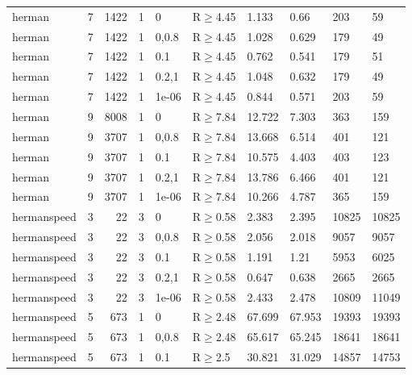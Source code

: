\begin{longtable}{llrrllllll}
 herman        & 7        &   	1422 &   1 & 0     & R$\geq$4.45  & 1.133   & 0.66    & 203     & 59     \\
 herman        & 7        &   	1422 &   1 & 0,0.8 & R$\geq$4.45  & 1.028   & 0.629   & 179     & 49     \\
 herman        & 7        &   	1422 &   1 & 0.1   & R$\geq$4.45  & 0.762   & 0.541   & 179     & 51     \\
 herman        & 7        &   	1422 &   1 & 0.2,1 & R$\geq$4.45  & 1.048   & 0.632   & 179     & 49     \\
 herman        & 7        &   	1422 &   1 & 1e-06 & R$\geq$4.45  & 0.844   & 0.571   & 203     & 59     \\
 herman        & 9        &   	8008 &   1 & 0     & R$\geq$7.84  & 12.722  & 7.303   & 363     & 159    \\
 herman        & 9        &   	3707 &   1 & 0,0.8 & R$\geq$7.84  & 13.668  & 6.514   & 401     & 121    \\
 herman        & 9        &   	3707 &   1 & 0.1   & R$\geq$7.84  & 10.575  & 4.403   & 403     & 123    \\
 herman        & 9        &   	3707 &   1 & 0.2,1 & R$\geq$7.84  & 13.786  & 6.466   & 401     & 121    \\
 herman        & 9        &   	3707 &   1 & 1e-06 & R$\geq$7.84  & 10.266  & 4.787   & 365     & 159    \\
 hermanspeed   & 3        &     	22 &   3 & 0     & R$\geq$0.58  & 2.383   & 2.395   & 10825   & 10825  \\
 hermanspeed   & 3        &     	22 &   3 & 0,0.8 & R$\geq$0.58  & 2.056   & 2.018   & 9057    & 9057   \\
 hermanspeed   & 3        &     	22 &   3 & 0.1   & R$\geq$0.58  & 1.191   & 1.21    & 5953    & 6025   \\
 hermanspeed   & 3        &     	22 &   3 & 0.2,1 & R$\geq$0.58  & 0.647   & 0.638   & 2665    & 2665   \\
 hermanspeed   & 3        &     	22 &   3 & 1e-06 & R$\geq$0.58  & 2.433   & 2.478   & 10809   & 11049  \\
 hermanspeed   & 5        &    	673 &   1 & 0     & R$\geq$2.48  & 67.699  & 67.953  & 19393   & 19393  \\
 hermanspeed   & 5        &    	673 &   1 & 0,0.8 & R$\geq$2.48  & 65.617  & 65.245  & 18641   & 18641  \\
 hermanspeed   & 5        &    	673 &   1 & 0.1   & R$\geq$2.5   & 30.821  & 31.029  & 14857   & 14753  \\

\end{longtable}
